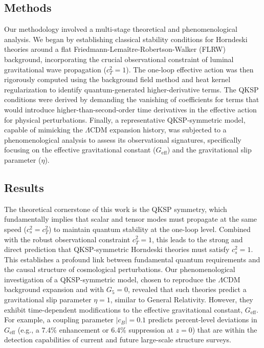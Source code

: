\documentclass[twocolumn]{aastex631}
\begin{document}
\subsection{Methods}
Our methodology involved a multi-stage theoretical and phenomenological analysis. We began by establishing classical stability conditions for Horndeski theories around a flat Friedmann-Lemaître-Robertson-Walker (FLRW) background, incorporating the crucial observational constraint of luminal gravitational wave propagation ($c_T^2=1$). The one-loop effective action was then rigorously computed using the background field method and heat kernel regularization to identify quantum-generated higher-derivative terms. The QKSP conditions were derived by demanding the vanishing of coefficients for terms that would introduce higher-than-second-order time derivatives in the effective action for physical perturbations. Finally, a representative QKSP-symmetric model, capable of mimicking the $\Lambda$CDM expansion history, was subjected to a phenomenological analysis to assess its observational signatures, specifically focusing on the effective gravitational constant ($G_{\text{eff}}$) and the gravitational slip parameter ($\eta$).

\subsection{Results}
The theoretical cornerstone of this work is the QKSP symmetry, which fundamentally implies that scalar and tensor modes must propagate at the same speed ($c_s^2 = c_T^2$) to maintain quantum stability at the one-loop level. Combined with the robust observational constraint $c_T^2=1$, this leads to the strong and direct prediction that QKSP-symmetric Horndeski theories must satisfy $c_s^2=1$. This establishes a profound link between fundamental quantum requirements and the causal structure of cosmological perturbations. Our phenomenological investigation of a QKSP-symmetric model, chosen to reproduce the $\Lambda$CDM background expansion and with $G_5=0$, revealed that such theories predict a gravitational slip parameter $\eta=1$, similar to General Relativity. However, they exhibit time-dependent modifications to the effective gravitational constant, $G_{\text{eff}}$. For example, a coupling parameter $|c_B|=0.1$ predicts percent-level deviations in $G_{\text{eff}}$ (e.g., a 7.4\% enhancement or 6.4\% suppression at $z=0$) that are within the detection capabilities of current and future large-scale structure surveys.
\end{document}
